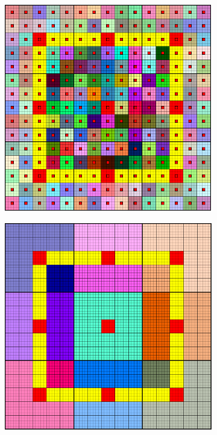 \begin{figure}[htbp]
  \begin{subfigure}[t]{0.3\textwidth}
    \centerline{\includegraphics[width=0.9\linewidth]{figs/square_cart_struct_cell_ml_lvl1_grid}}
  \end{subfigure}
  \hfill
  \begin{subfigure}[t]{0.3\textwidth}
    \centerline{\includegraphics[width=0.9\linewidth]{figs/square_cart_struct_cell_ml_lvl2_grid}}

\end{subfigure}
\end{figure}
